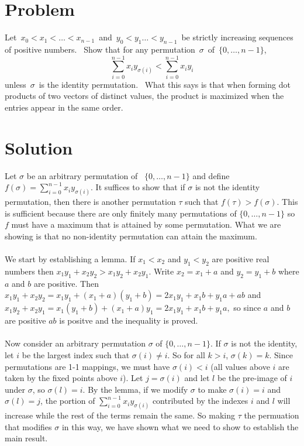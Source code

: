 \documentclass[11pt,a4paper]{report}
\theoremstyle{plain}
\theoremstyle{definition}
\theoremstyle{remark}
\begin{document}
\section*{Problem}
Let $x_0 < x_1 < … < x_{n-1}$ and $y_0 < y_1 … < y_{n - 1}$ be strictly increasing sequences of positive numbers.  Show that for any permutation $\sigma$ of $\{0, … , n-1\}$,
$$\sum_{i = 0}^{n-1} x_i y_{\sigma(i)}< \sum_{i = 0}^{n-1} x_i y_i$$
unless $\sigma$ is the identity permutation.  What this says is that when forming dot products of two vectors of distinct values, the product is maximized when the entries appear in the same order.

\section*{Solution}
 Let $\sigma$ be an arbitrary permutation of  $\{0, … , n-1\}$ and define $f(\sigma) = \sum_{i = 0}^{n-1} x_i y_{\sigma(i)}$.   It suffices to show that if $\sigma$ is not the identity permutation, then there is another permutation $\tau$ such that $f(\tau) > f(\sigma)$.    This is sufficient because there are only finitely many permutations of $\{0, … , n-1\}$ so $f$ must have a maximum that is attained by some permutation.  What we are showing is that no non-identity permutation can attain the maximum.
 \\\\
 We start by establishing a lemma.
 \lem  If $x_1< x_2$ and $y_1 < y_2$ are positive real numbers then  $x_1 y_1 + x_2 y_2> x_1 y_2 + x_2 y_1$.
 \proof Write $x_2 = x_1 + a$ and $y_2 = y_1 + b$ where $a$ and $b$ are positive.  Then $x_1 y_1 + x_2 y_2 = x_1 y_1 + (x_1 + a)(y_1 + b) = 2x_1y_1 + x_1 b + y_1a + ab$ and $x_1 y_2 + x_2 y_1 = x_1(y_1 + b) + (x_1 + a)y_1 = 2x_1y_1 + x_1b + y_1a,$ so since $a$ and $b$ are positive $ab$ is positve and the inequality is proved.
 \\\\
 Now consider an arbitrary permutation $\sigma$ of $\{0, … , n-1\}$.  If $\sigma$ is not the identity, let $i$ be the largest index such that $\sigma(i)  \ne i$. So for all $k > i$, $\sigma(k) = k$.  Since permutations are 1-1 mappings, we must have $\sigma(i) < i$ (all values above $i$ are taken by the fixed points above $i$).  Let $j = \sigma(i)$ and let $l$ be the pre-image of $i$  under $\sigma$,  so $\sigma(l) = i$.  By the lemma, if we modify $\sigma$ to make $\sigma(i) = i$ and $\sigma(l) = j$, the portion of $\sum_{i = 0}^{n-1} x_i y_{\sigma(i)}$ contributed by the indexes $i$ and $l$ will increase while the rest of the terms remain the same.  So making $\tau$ the permuation that modifies $\sigma$ in this way, we have shown what we need to show to establish the main result.
\end{document}
